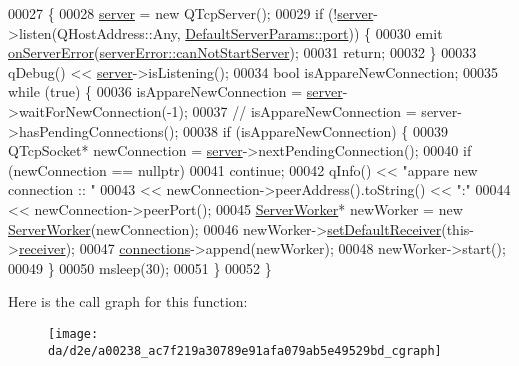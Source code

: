 \begin{DoxyCode}
00027                            \{
00028   \hyperlink{a00238_aee9a8e6c0f1d25fc2fcb4662631c0c74}{server} = \textcolor{keyword}{new} QTcpServer();
00029   \textcolor{keywordflow}{if} (!\hyperlink{a00238_aee9a8e6c0f1d25fc2fcb4662631c0c74}{server}->listen(QHostAddress::Any, \hyperlink{a00147_a7ac0709dc92e311b3524c365a2a05d96}{DefaultServerParams::port})) \{
00030     emit \hyperlink{a00238_ae97f8eaa15a3da8f069ad502e89039ae}{onServerError}(\hyperlink{a00131_a65727a063024ff0dedf1ac2f087f4165af21059407733b78da140dbc07981a44a}{serverError::canNotStartServer});
00031     \textcolor{keywordflow}{return};
00032   \}
00033   qDebug() << \hyperlink{a00238_aee9a8e6c0f1d25fc2fcb4662631c0c74}{server}->isListening();
00034   \textcolor{keywordtype}{bool} isAppareNewConnection;
00035   \textcolor{keywordflow}{while} (\textcolor{keyword}{true}) \{
00036     isAppareNewConnection = \hyperlink{a00238_aee9a8e6c0f1d25fc2fcb4662631c0c74}{server}->waitForNewConnection(-1);
00037     \textcolor{comment}{//    isAppareNewConnection = server->hasPendingConnections();}
00038     \textcolor{keywordflow}{if} (isAppareNewConnection) \{
00039       QTcpSocket* newConnection = \hyperlink{a00238_aee9a8e6c0f1d25fc2fcb4662631c0c74}{server}->nextPendingConnection();
00040       \textcolor{keywordflow}{if} (newConnection == \textcolor{keyword}{nullptr})
00041         \textcolor{keywordflow}{continue};
00042       qInfo() << \textcolor{stringliteral}{"appare new connection  :: "}
00043               << newConnection->peerAddress().toString() << \textcolor{stringliteral}{":"}
00044               << newConnection->peerPort();
00045       \hyperlink{a00242}{ServerWorker}* newWorker = \textcolor{keyword}{new} \hyperlink{a00242}{ServerWorker}(newConnection);
00046       newWorker->\hyperlink{a00162_aa85db0004c26606c5ac294e5de000b96}{setDefaultReceiver}(this->\hyperlink{a00162_aa57ce2f74f8ad76abb38974f85b97ac5}{receiver});
00047       \hyperlink{a00238_a7d9e1b1ac7c2d57b439ab5918e7c31d0}{connections}->append(newWorker);
00048       newWorker->start();
00049     \}
00050     msleep(30);
00051   \}
00052 \}
\end{DoxyCode}
Here is the call graph for this function\+:
\nopagebreak
\begin{figure}[H]
\begin{center}
\leavevmode
\texttt{[image: da/d2e/a00238\_ac7f219a30789e91afa079ab5e49529bd\_cgraph]}
\end{center}
\end{figure}
\mbox{\label{a00162_aa85db0004c26606c5ac294e5de000b96}} 

